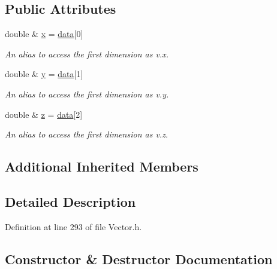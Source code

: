 \subsection*{Public Attributes}
\begin{DoxyCompactItemize}
\item 
double \& \hyperlink{classzbe_1_1_vector3_d_aa469ac9ec2a2e09919b0eed33fcfc81c}{x} = \hyperlink{classzbe_1_1_vector_a1adaf8d4244fe2c1d762d6c58f4b01eb}{data}\mbox{[}0\mbox{]}
\begin{DoxyCompactList}\small\item\em An alias to access the first dimension as v.\+x. \end{DoxyCompactList}\item 
double \& \hyperlink{classzbe_1_1_vector3_d_a0c6f850b940c6eb85132db01490f108f}{y} = \hyperlink{classzbe_1_1_vector_a1adaf8d4244fe2c1d762d6c58f4b01eb}{data}\mbox{[}1\mbox{]}
\begin{DoxyCompactList}\small\item\em An alias to access the first dimension as v.\+y. \end{DoxyCompactList}\item 
double \& \hyperlink{classzbe_1_1_vector3_d_a165df2c9c8ab4cf1ebb322ecffc9efba}{z} = \hyperlink{classzbe_1_1_vector_a1adaf8d4244fe2c1d762d6c58f4b01eb}{data}\mbox{[}2\mbox{]}
\begin{DoxyCompactList}\small\item\em An alias to access the first dimension as v.\+z. \end{DoxyCompactList}\end{DoxyCompactItemize}
\subsection*{Additional Inherited Members}


\subsection{Detailed Description}


Definition at line 293 of file Vector.\+h.



\subsection{Constructor \& Destructor Documentation}
\hypertarget{classzbe_1_1_vector3_d_a0d146ef6fbef42b6deb4515c249be745}{}
